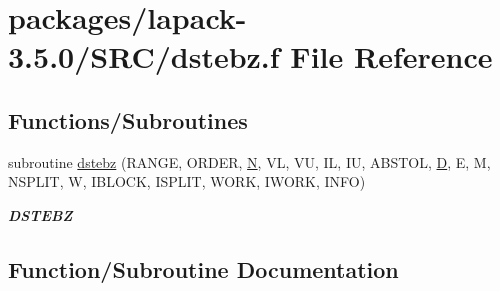 \hypertarget{dstebz_8f}{}\section{packages/lapack-\/3.5.0/\+S\+R\+C/dstebz.f File Reference}
\label{dstebz_8f}
\subsection*{Functions/\+Subroutines}
\begin{DoxyCompactItemize}
\item 
subroutine \hyperlink{dstebz_8f_a28f88843da09a0ee400daf46caaabec6}{dstebz} (R\+A\+N\+G\+E, O\+R\+D\+E\+R, \hyperlink{polmisc_8c_a0240ac851181b84ac374872dc5434ee4}{N}, V\+L, V\+U, I\+L, I\+U, A\+B\+S\+T\+O\+L, \hyperlink{odrpack_8h_a7dae6ea403d00f3687f24a874e67d139}{D}, E, M, N\+S\+P\+L\+I\+T, W, I\+B\+L\+O\+C\+K, I\+S\+P\+L\+I\+T, W\+O\+R\+K, I\+W\+O\+R\+K, I\+N\+F\+O)
\begin{DoxyCompactList}\small\item\em {\bfseries D\+S\+T\+E\+B\+Z} \end{DoxyCompactList}\end{DoxyCompactItemize}


\subsection{Function/\+Subroutine Documentation}
\hypertarget{dstebz_8f_a28f88843da09a0ee400daf46caaabec6}{}
